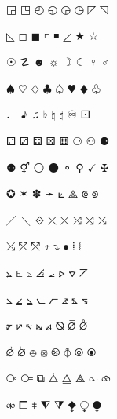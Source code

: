 \documentclass{article}
\begin{document}
$\squarelrquad$ $\squareurquad$ $\circleulquad$ $\circlellquad$ $\circlelrquad$ $\circleurquad$ $\ultriangle$ $\urtriangle$ \par
$\lltriangle$ $\mdwhtsquare$ $\mdblksquare$ $\mdsmwhtsquare$ $\mdsmblksquare$ $\lrtriangle$ $\bigstar$ $\bigwhitestar$ \par
$\astrosun$ $\danger$ $\blacksmiley$ $\sun$ $\rightmoon$ $\leftmoon$ $\female$ $\male$ \par
$\spadesuit$ $\heartsuit$ $\diamondsuit$ $\clubsuit$ $\varspadesuit$ $\varheartsuit$ $\vardiamondsuit$ $\varclubsuit$ \par
$\quarternote$ $\eighthnote$ $\twonotes$ $\flat$ $\natural$ $\sharp$ $\acidfree$ $\dicei$ \par
$\diceii$ $\diceiii$ $\diceiv$ $\dicev$ $\dicevi$ $\circledrightdot$ $\circledtwodots$ $\blackcircledrightdot$ \par
$\blackcircledtwodots$ $\Hermaphrodite$ $\mdwhtcircle$ $\mdblkcircle$ $\mdsmwhtcircle$ $\neuter$ $\checkmark$ $\maltese$ \par
$\circledstar$ $\varstar$ $\dingasterisk$ $\draftingarrow$ $\threedangle$ $\whiteinwhitetriangle$ $\subsetcirc$ $\supsetcirc$ \par
$\diagup$ $\diagdown$ $\diamondcdot$ $\rdiagovfdiag$ $\fdiagovrdiag$ $\seovnearrow$ $\neovsearrow$ $\fdiagovnearrow$ \par
$\rdiagovsearrow$ $\neovnwarrow$ $\nwovnearrow$ $\uprightcurvearrow$ $\downrightcurvedarrow$ $\mdsmblkcircle$ $\fourvdots$ $\vzigzag$ \par
$\measuredangleleft$ $\rightanglesqr$ $\rightanglemdot$ $\angles$ $\angdnr$ $\gtlpar$ $\sphericalangleup$ $\turnangle$ \par
$\revangle$ $\angleubar$ $\revangleubar$ $\wideangledown$ $\wideangleup$ $\measanglerutone$ $\measanglelutonw$ $\measanglerdtose$ \par
$\measangleldtosw$ $\measangleurtone$ $\measangleultonw$ $\measangledrtose$ $\measangledltosw$ $\revemptyset$ $\emptysetobar$ $\emptysetocirc$ \par
$\emptysetoarr$ $\emptysetoarrl$ $\obot$ $\olcross$ $\odotslashdot$ $\uparrowoncircle$ $\circledwhitebullet$ $\circledbullet$ \par
$\cirscir$ $\cirE$ $\boxonbox$ $\triangleodot$ $\triangleubar$ $\triangles$ $\iinfin$ $\tieinfty$ \par
$\nvinfty$ $\laplac$ $\thermod$ $\downtriangleleftblack$ $\downtrianglerightblack$ $\blackdiamonddownarrow$ $\circledownarrow$ $\blackcircledownarrow$ \par
\end{document}
